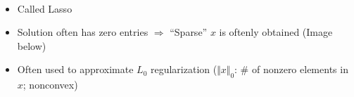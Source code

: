 \begin{itemize}
\begin{equation}
\begin{aligned}
    \end{aligned}\end{equation}
    \begin{itemize}
        \item Called Lasso
        \item Solution often has zero entries $\Rightarrow$ ``Sparse'' $x$ is oftenly obtained (Image below)
        \item Often used to approximate $L_0$ regularization ($\Vert x\Vert_0$: \# of nonzero elements in $x$; nonconvex)
    \end{itemize}
    \begin{figures}
    \end{figures}
\end{itemize}
